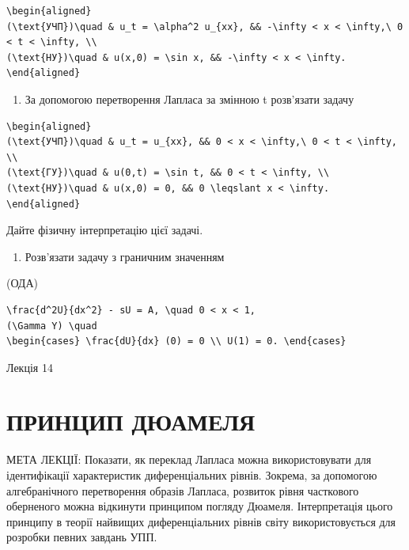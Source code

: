 \documentclass[
  ukrainian,
]{article}
\providecommand{\tightlist}{%
  \setlength{\itemsep}{0pt}\setlength{\parskip}{0pt}}
\begin{document}
\begin{verbatim}
\begin{aligned}
(\text{УЧП})\quad & u_t = \alpha^2 u_{xx}, && -\infty < x < \infty,\ 0 < t < \infty, \\
(\text{НУ})\quad & u(x,0) = \sin x, && -\infty < x < \infty.
\end{aligned}
\end{verbatim}

\begin{enumerate}
\def\labelenumi{\arabic{enumi}.}
\setcounter{enumi}{2}
\tightlist
\item
  За допомогою перетворення Лапласа за змінною t розв'язати задачу
\end{enumerate}

\begin{verbatim}
\begin{aligned}
(\text{УЧП})\quad & u_t = u_{xx}, && 0 < x < \infty,\ 0 < t < \infty, \\
(\text{ГУ})\quad & u(0,t) = \sin t, && 0 < t < \infty, \\
(\text{НУ})\quad & u(x,0) = 0, && 0 \leqslant x < \infty.
\end{aligned}
\end{verbatim}

Дайте фізичну інтерпретацію цієї задачі.

\begin{enumerate}
\def\labelenumi{\arabic{enumi}.}
\setcounter{enumi}{3}
\tightlist
\item
  Розв'язати задачу з граничним значенням
\end{enumerate}

(ОДА)

\begin{verbatim}
\frac{d^2U}{dx^2} - sU = A, \quad 0 < x < 1,
(\Gamma Y) \quad
\begin{cases} \frac{dU}{dx} (0) = 0 \\ U(1) = 0. \end{cases}
\end{verbatim}

Лекція 14

\section{ПРИНЦИП
ДЮАМЕЛЯ}\label{ux43fux440ux438ux43dux446ux438ux43f-ux434ux44eux430ux43cux435ux43bux44f}

МЕТА ЛЕКЦІЇ: Показати, як переклад Лапласа можна використовувати для
ідентифікації характеристик диференціальних рівнів. Зокрема, за
допомогою алгебранічного перетворення образів Лапласа, розвиток рівня
часткового оберненого можна відкинути принципом погляду Дюамеля.
Інтерпретація цього принципу в теорії найвищих диференціальних рівнів
світу використовується для розробки певних завдань УПП.
\end{document}
